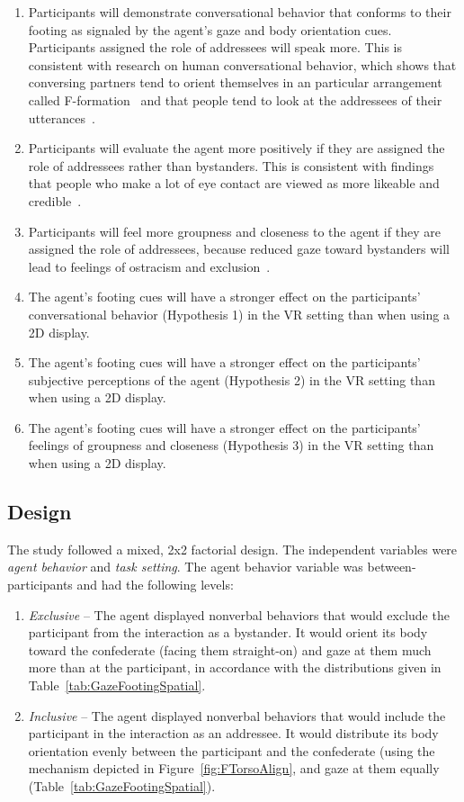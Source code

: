\begin{enumerate}
\item Participants will demonstrate conversational behavior that conforms to their footing as signaled by the agent's gaze and body orientation cues. Participants assigned the role of addressees will speak more. This is consistent with research on human conversational behavior, which shows that conversing partners tend to orient themselves in an particular arrangement called F-formation~\citep{kendon1990conducting} and that people tend to look at the addressees of their utterances~\citep{kendon1967some}.
\item Participants will evaluate the agent more positively if they are assigned the role of addressees rather than bystanders. This is consistent with findings that people who make a lot of eye contact are viewed as more likeable and credible~\citep{argyle1976gaze,beebe1976effects}.
\item Participants will feel more groupness and closeness to the agent if they are assigned the role of addressees, because reduced gaze toward bystanders will lead to feelings of ostracism and exclusion~\citep{wirth2010eye}.
\item The agent's footing cues will have a stronger effect on the participants' conversational behavior (Hypothesis 1) in the VR setting than when using a 2D display.
\item The agent's footing cues will have a stronger effect on the participants' subjective perceptions of the agent (Hypothesis 2) in the VR setting than when using a 2D display.
\item The agent's footing cues will have a stronger effect on the participants' feelings of groupness and closeness (Hypothesis 3) in the VR setting than when using a 2D display.
\end{enumerate}

\subsection{Design}

The study followed a mixed, 2x2 factorial design. The independent variables were \emph{agent behavior} and \emph{task setting}. The agent behavior variable was between-participants and had the following levels:

\begin{enumerate}
\item \emph{Exclusive} -- The agent displayed nonverbal behaviors that would exclude the participant from the interaction as a bystander. It would orient its body toward the confederate (facing them straight-on) and gaze at them much more than at the participant, in accordance with the distributions given in Table~\ref{tab:GazeFootingSpatial}.
\item \emph{Inclusive} -- The agent displayed nonverbal behaviors that would include the participant in the interaction as an addressee. It would distribute its body orientation evenly between the participant and the confederate (using the mechanism depicted in Figure~\ref{fig:FTorsoAlign}, and gaze at them equally (Table~\ref{tab:GazeFootingSpatial}).
\end{enumerate}

